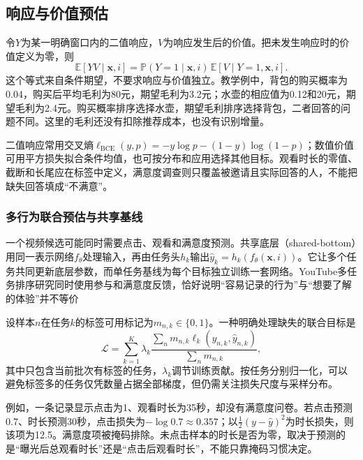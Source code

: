 \subsection{响应与价值预估}
\label{sec:rs-response-value}

令$Y$为某一明确窗口内的二值响应，$V$为响应发生后的价值。把未发生响应时的价值定义为零，则
\begin{equation}
 \mathbb E[YV\mid\bm x,i]
 =\mathbb P(Y=1\mid\bm x,i)\,
   \mathbb E[V\mid Y=1,\bm x,i].
 \label{eq:rs-response-value}
\end{equation}
这个等式来自条件期望，不要求响应与价值独立。教学例中，背包的购买概率为0.04，购买后平均毛利为80元，期望毛利为3.2元；水壶的相应值为0.12和20元，期望毛利为2.4元。购买概率排序选择水壶，期望毛利排序选择背包，二者回答的问题不同。这里的毛利还没有扣除推荐成本，也没有识别增量。

二值响应常用交叉熵$\ell_{\mathrm{BCE}}(y,p)=-y\log p-(1-y)\log(1-p)$；数值价值可用平方损失拟合条件均值，也可按分布和应用选择其他目标。观看时长的零值、截断和长尾应在标签中定义，满意度调查则只覆盖被邀请且实际回答的人，不能把缺失回答填成“不满意”。

\subsubsection{多行为联合预估与共享基线}
\label{sec:rs-shared-bottom}

一个视频候选可能同时需要点击、观看和满意度预测。共享底层（shared-bottom）用同一表示网络$f_\theta$处理输入，再由任务头$h_k$输出$\widehat y_k=h_k(f_\theta(\bm x,i))$。它让多个任务共同更新底层参数，而单任务基线为每个目标独立训练一套网络。YouTube多任务排序研究同时使用参与和满意度反馈，恰好说明“容易记录的行为”与“想要了解的体验”并不等价

设样本$n$在任务$k$的标签可用标记为$m_{n,k}\in\{0,1\}$。一种明确处理缺失的联合目标是
\begin{equation}
 \mathcal L=\sum_{k=1}^{K}\lambda_k
 \frac{\sum_n m_{n,k}\ell_k(y_{n,k},\widehat y_{n,k})}
      {\sum_n m_{n,k}},
 \label{eq:rs-multitask-loss}
\end{equation}
其中只包含当前批次有标签的任务，$\lambda_k$调节训练贡献。按任务分别归一化，可以避免标签多的任务仅凭数量占据全部梯度，但仍需关注损失尺度与采样分布。

例如，一条记录显示点击为1、观看时长为35秒，却没有满意度问卷。若点击预测0.7、时长预测30秒，点击损失为$-\log0.7\approx0.357$；以$\tfrac12(y-\widehat y)^2$为时长损失，则该项为12.5。满意度项被掩码排除。未点击样本的时长是否为零，取决于预测的是“曝光后总观看时长”还是“点击后观看时长”，不能只靠掩码习惯决定。

